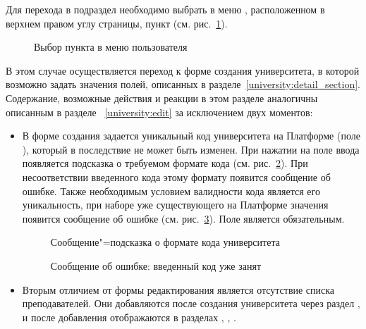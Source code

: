 Для перехода в подраздел необходимо выбрать в меню , расположенном в верхнем правом углу страницы, пункт  (см. рис.~\ref{university:create_menu}).

		\begin{figure}[H]
		\caption{Выбор пункта  в меню пользователя}
		\label{university:create_menu}
		\end{figure}	
		
В этом случае осуществляется переход к форме создания университета, в которой возможно задать значения полей, описанных в разделе~\ref{university:detail_section}. Содержание, возможные действия и реакции в этом разделе аналогичны описанным в разделе ~\ref{university:edit} за исключением двух моментов:
\begin{itemize}
	\item В форме создания задается уникальный код университета на Платформе (поле ), который в последствие не может быть изменен. При нажатии на поле ввода появляется подсказка о требуемом формате кода (см. рис.~\ref{university:create_slug_help}). При несоответствии введенного кода этому формату появится сообщение об ошибке. Также необходимым условием валидности кода является его уникальность, при наборе уже существующего на Платформе значения появится сообщение об ошибке (см. рис.~\ref{university:create_slug_exist}). Поле  является обязательным.
	
		\begin{figure}[H]
		\caption{Сообщение"=подсказка о формате кода университета}
		\label{university:create_slug_help}
		\end{figure}
		
		\begin{figure}[H]
		\caption{Сообщение об ошибке: введенный код уже занят}
		\label{university:create_slug_exist}
		\end{figure}	
		
	\item Вторым отличием от формы редактирования является отсутствие списка преподавателей. Они добавляются после создания университета через раздел , и после добавления отображаются в разделах , , .
\end{itemize}
	
	

		

	
	
	
	
	
	